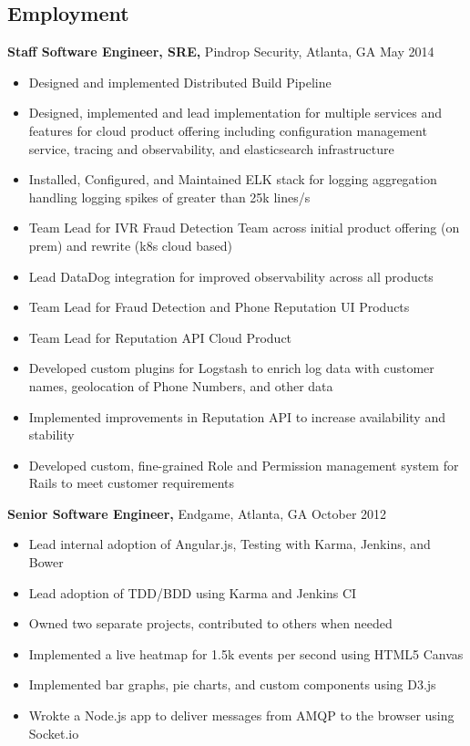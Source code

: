 \documentclass[margin]{res}
\begin{document}
\begin{resume}
\section{Employment}

    {\bf Staff Software Engineer, SRE,} Pindrop Security, Atlanta, GA \hfill May 2014
        \begin{itemize} \itemsep -2pt %
            \item Designed and implemented Distributed Build Pipeline
            \item Designed, implemented and lead implementation for multiple services and features for cloud
                product offering including configuration management service, tracing and observability, and
                elasticsearch infrastructure
            \item Installed, Configured, and Maintained ELK stack for logging aggregation handling logging
                spikes of greater than 25k lines/s
            \item Team Lead for IVR Fraud Detection Team across initial product offering (on prem) and rewrite
                (k8s cloud based)
            \item Lead DataDog integration for improved observability across all products
            \item Team Lead for Fraud Detection and Phone Reputation UI Products
            \item Team Lead for Reputation API Cloud Product
            \item Developed custom plugins for Logstash to enrich log data with customer names, geolocation of
                Phone Numbers, and other data
            \item Implemented improvements in Reputation API to increase availability and stability
            \item Developed custom, fine-grained Role and Permission management system for Rails to meet
                customer requirements
        \end{itemize}

    {\bf Senior Software Engineer,} Endgame, Atlanta, GA \hfill October 2012
        \begin{itemize} \itemsep -2pt %
            \item Lead internal adoption of Angular.js, Testing with Karma,
                Jenkins, and Bower
            \item Lead adoption of TDD/BDD using Karma and Jenkins CI
            \item Owned two separate projects, contributed to others when
                needed
            \item Implemented a live heatmap for 1.5k events per second using HTML5 Canvas
            \item Implemented bar graphs, pie charts, and custom components using D3.js
            \item Wrokte a Node.js app to deliver messages from AMQP to the browser using
                Socket.io
        \end{itemize}


\end{resume}
\end{document}
